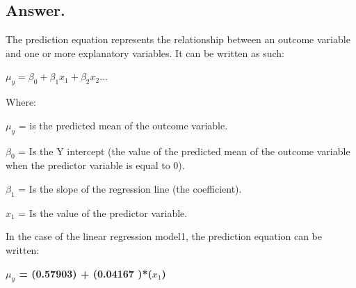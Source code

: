 \documentclass[12pt,letterpaper]{article}
\begin{document}
\begin{enumerate}
		\subsection*{Answer.}
		The prediction equation represents the relationship between an outcome variable and one or more explanatory variables. It can be written as such:
		
		\vspace{0.1cm}
		
		$\mu_y = \beta_0 + \beta_1 x_1 + \beta_2 x_2$...
		
		\vspace{0.1cm}
		
		Where:
		
		\vspace{0.1cm}
		
		$\mu_y$ = is the predicted mean of the outcome variable.
		
		\vspace{0.1cm}
		
		$\beta_0$ = Is the Y intercept (the value of the predicted mean of the outcome variable when the predictor variable is equal to 0).
		
		\vspace{0.1cm}
		
		$\beta_1$ = Is the slope of the regression line (the coefficient).
		
		\vspace{0.1cm}
		
		$x_1$ = Is the value of the predictor variable.
		
		\vspace{1cm}
		
		In the case of the linear regression model1, the prediction equation can be written:
		
		\vspace{0.1cm}
		
		\textbf{$\mu_y$ = (0.57903) + (0.04167 )*($x_1$)}
	\end{enumerate}
	
\newpage
\end{document}
